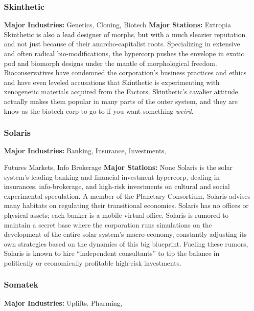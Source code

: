 \subsubsection{Skinthetic}

\textbf{Major Industries:} Genetics, Cloning, Biotech
\textbf{Major Stations:} Extropia
Skinthetic is also a lead designer of morphs, but with 
a much sleazier reputation and not just because of 
their anarcho-capitalist roots. Specializing in extensive and often radical bio-modifications, the hypercorp pushes the envelope in exotic pod and biomorph 
designs under the mantle of morphological freedom. 
Bioconservatives have condemned the corporation's 
business practices and ethics and have even leveled 
accusations that Skinthetic is experimenting with 
xenogenetic materials acquired from the Factors. 
Skinthetic's cavalier attitude actually makes them 
popular in many parts of the outer system, and they 
are know as the biotech corp to go to if you want 
something \textit{weird.}

\subsubsection{Solaris}

\textbf{Major Industries:} Banking, Insurance, Investments, 

Futures Markets, Info Brokerage
\textbf{Major Stations:} None
Solaris is the solar system's leading banking and financial investment hypercorp, dealing in insurances, 
info-brokerage, and high-risk investments on cultural 
and social experimental speculation. A member of the 
Planetary Consortium, Solaris advises many habitats 
on regulating their transitional economies. Solaris has 
no offices or physical assets; each banker is a mobile 
virtual office. Solaris is rumored to maintain a secret 
base where the corporation runs simulations on the 
development of the entire solar system's macro-economy, constantly adjusting its own strategies based 
on the dynamics of this big blueprint. Fueling these 
rumors, Solaris is known to hire ``independent consultants'' to tip the balance in politically or economically 
profitable high-risk investments.

\subsubsection{Somatek}

\textbf{Major Industries:} Uplifts, Pharming, 

